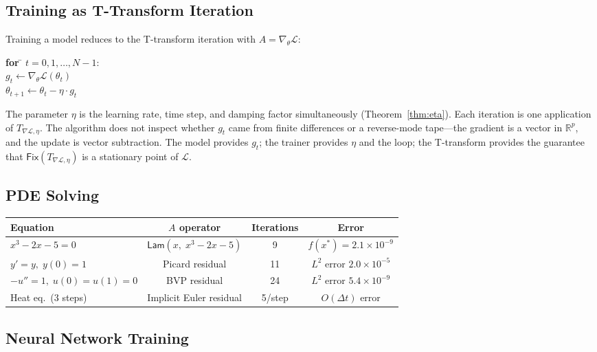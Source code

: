 \documentclass{lmcs}
\theoremstyle{plain}
\theoremstyle{definition}
\newcommand{\RR}{\mathbb{R}}
\newcommand{\fix}{\mathsf{Fix}}
\begin{document}
\subsection{Training as T-Transform Iteration}

Training a model reduces to the T-transform iteration with
$A = \nabla_\theta \mathcal{L}$:
\begin{tabbing}
\quad \= \textbf{for} \= $t = 0, 1, \dots, N-1$: \\
\> \> $g_t \leftarrow \nabla_\theta \mathcal{L}(\theta_t)$ \\
\> \> $\theta_{t+1} \leftarrow \theta_t - \eta \cdot g_t$
\end{tabbing}
The parameter $\eta$ is the learning rate, time step, and damping factor
simultaneously (Theorem~\ref{thm:eta}). Each iteration is one application of
$T_{\nabla \mathcal{L}, \eta}$. The algorithm does not inspect whether $g_t$
came from finite differences or a reverse-mode tape---the gradient is a
vector in $\RR^p$, and the update is vector subtraction. The model provides
$g_t$; the trainer provides $\eta$ and the loop; the T-transform provides
the guarantee that $\fix(T_{\nabla \mathcal{L}, \eta})$ is a stationary
point of $\mathcal{L}$.

\subsection{PDE Solving}

\begin{center}
\begin{tabular}{l c c c}
\toprule
Equation & $A$ operator & Iterations & Error \\
\midrule
$x^3 - 2x - 5 = 0$ &
  $\mathsf{Lam}(x,\; x^3 - 2x - 5)$ & 9 & $f(x^*) = 2.1\times 10^{-9}$ \\
$y' = y,\; y(0) = 1$ &
  Picard residual & 11 & $L^2$ error $2.0\times 10^{-5}$ \\
$-u'' = 1,\; u(0) = u(1) = 0$ &
  BVP residual & 24 & $L^2$ error $5.4\times 10^{-9}$ \\
Heat eq.\ (3 steps) &
  Implicit Euler residual & 5/step & $O(\Delta t)$ error \\
\bottomrule
\end{tabular}
\end{center}

\subsection{Neural Network Training}
\end{document}
